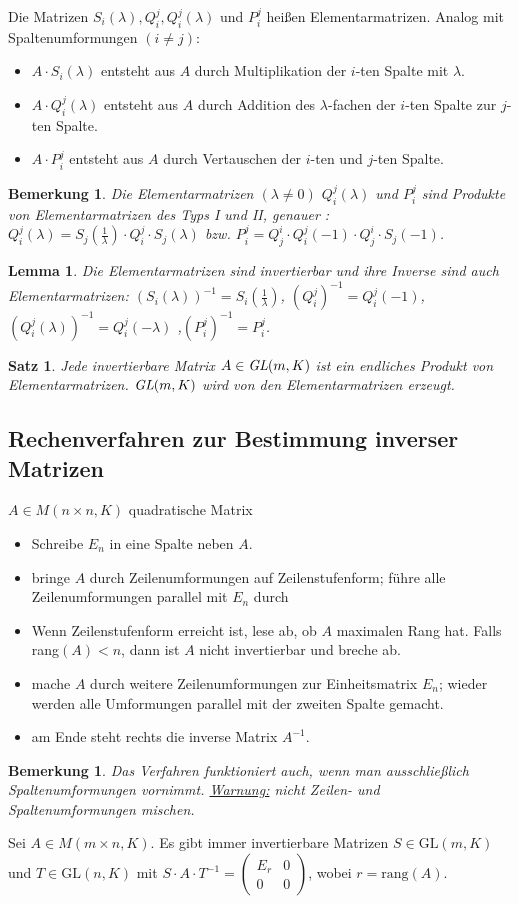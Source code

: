 \documentclass[12pt,a4paper]{article}
\theoremstyle{plain}
\newtheorem{Satz}[Theorem]{Satz}
\newtheorem{Lemma}[Theorem]{Lemma}
\newtheorem{Bemerkung}[Theorem]{Bemerkung}
\numberwithin{equation}{section}
\begin{document}
Die Matrizen $S_i(\lambda), Q^j_i, Q^j_i(\lambda)$ und $P^j_i$ heißen Elementarmatrizen. Analog mit Spaltenumformungen $(i\neq j)$: \begin{itemize}
\item $A\cdot S_i(\lambda)$ entsteht aus $A$ durch Multiplikation der $i$-ten Spalte mit $\lambda$.
\item $A\cdot Q^j_i(\lambda)$ entsteht aus $A$ durch Addition des $\lambda$-fachen der $i$-ten Spalte zur $j$-ten Spalte.
\item $A\cdot P^j_i$ entsteht aus $A$ durch Vertauschen der $i$-ten und $j$-ten Spalte.
\end{itemize}
\begin{Bemerkung}
Die Elementarmatrizen $(\lambda\neq 0)$ $Q^j_i(\lambda)$ und $P^j_i$ sind Produkte von Elementarmatrizen des Typs I und II, genauer : $Q^j_i(\lambda)=S_j(\frac{1}{\lambda})\cdot Q^j_i\cdot S_j(\lambda)$ bzw. $P^j_i=Q^i_j\cdot Q^j_i(-1)\cdot Q^i_j\cdot S_j(-1)$.
\end{Bemerkung}
\begin{Lemma}
Die Elementarmatrizen sind invertierbar und ihre Inverse sind auch Elementarmatrizen: $(S_i(\lambda))^{-1}=S_i(\frac{1}{\lambda})$, $(Q^j_i)^{-1}=Q^j_i(-1)$, $(Q_i^j(\lambda))^{-1}=Q^j_i(-\lambda)$ ,$(P^j_i)^{-1}=P^j_i$.
\end{Lemma}
\begin{Satz}
Jede invertierbare Matrix $A\in\emph{GL}(m,K)$ ist ein endliches Produkt von Elementarmatrizen. \glqq$\emph{GL}(m,K)$ wird von den Elementarmatrizen erzeugt.\grqq
\end{Satz}
\subsection{Rechenverfahren zur Bestimmung inverser Matrizen}
$A\in M(n\times n,K)$ quadratische Matrix
\begin{itemize}
\item Schreibe $E_n$ in eine Spalte neben $A$.
\item bringe $A$ durch Zeilenumformungen auf Zeilenstufenform; führe alle Zeilenumformungen parallel mit $E_n$ durch
\item Wenn Zeilenstufenform erreicht ist, lese ab, ob $A$ maximalen Rang hat. Falls rang$(A)<n$, dann ist $A$ nicht invertierbar und breche ab.
\item mache $A$ durch weitere Zeilenumformungen zur Einheitsmatrix $E_n$; wieder werden alle Umformungen parallel mit der zweiten Spalte gemacht.
\item am Ende steht rechts die inverse Matrix $A^{-1}$.
\end{itemize}
\begin{Bemerkung}
Das Verfahren funktioniert auch, wenn man ausschließlich Spaltenumformungen vornimmt. \underline{Warnung:} nicht Zeilen- und Spaltenumformungen mischen.
\end{Bemerkung}
Sei $A\in M(m\times n,K)$. Es gibt immer invertierbare Matrizen $S\in\text{GL}(m,K)$ und $T\in\text{GL}(n,K)$ mit $S\cdot A\cdot T^{-1}=\left(\begin{matrix} E_r & 0 \\ 0 & 0 \end{matrix}\right)$, wobei $r=\text{rang}(A)$.
\end{document}
